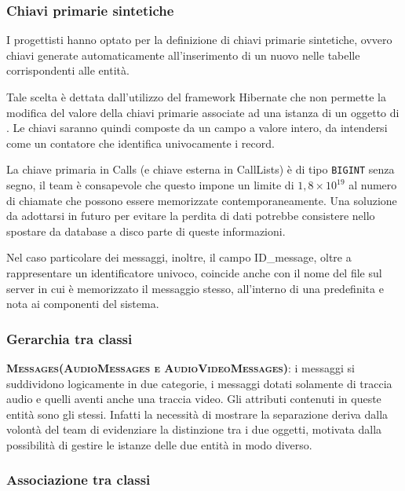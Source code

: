 \subsubsection{Chiavi primarie sintetiche}
I progettisti hanno optato per la definizione di chiavi primarie sintetiche, ovvero chiavi generate automaticamente all'inserimento di un nuovo  nelle tabelle corrispondenti alle entità.

Tale scelta è dettata dall'utilizzo del framework Hibernate che non permette la modifica del valore della chiavi primarie associate ad una istanza di un oggetto di . Le chiavi saranno quindi composte da un campo a valore intero, da intendersi come un contatore che identifica univocamente i record.

La chiave primaria in Calls (e chiave esterna in CallLists) è di tipo \texttt{BIGINT} senza segno, il team è consapevole che questo impone un limite di $1,8 \times10^{19}$ al numero di chiamate che possono essere memorizzate contemporaneamente. Una soluzione da adottarsi in futuro per evitare la perdita di dati potrebbe consistere nello spostare da database a disco parte di queste informazioni.

Nel caso particolare dei messaggi, inoltre, il campo ID\_message, oltre a rappresentare un identificatore univoco, coincide anche con il nome del file sul server in cui è memorizzato il messaggio stesso, all'interno di una  predefinita e nota ai componenti del sistema.

\subsubsection{Gerarchia tra classi}

\begin{description}
	\item{\scshape\bfseries Messages(AudioMessages e AudioVideoMessages)}: i messaggi si suddividono logicamente in due categorie, i messaggi dotati solamente di traccia audio e quelli aventi anche una traccia video. Gli attributi contenuti in queste entità sono gli stessi. Infatti la necessità di mostrare la separazione deriva dalla volontà del team di evidenziare la distinzione tra i due oggetti, motivata dalla possibilità di gestire le istanze delle due entità in modo diverso.
\end{description}

\subsubsection{Associazione tra classi}


